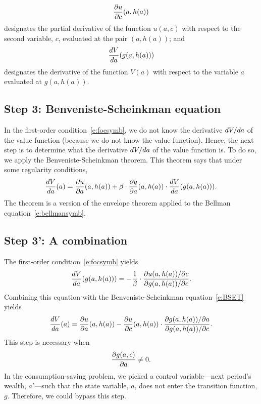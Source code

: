 \documentclass[letterpaper, 11pt, leqno]{article}
\begin{document}
\begin{equation*}
\pd{u}{c}(a,h(a))
\end{equation*}
designates the partial derivative of the function $u(a,c)$ with respect to the second variable, $c$, evaluated at the pair $(a,h(a))$;
and 
\begin{equation*}
\od{V}{a}(g(a,h(a)))
\end{equation*}
designates the derivative of the function $V(a)$ with respect to the variable $a$ evaluated at $g(a,h(a))$.

\subsection{Step 3: Benveniste-Scheinkman equation}

In the first-order condition~\eqref{e:focsymb}, we do not know the derivative $\odx{V}{a}$ of the value function (because we do not know the value function). Hence, the next step is to determine what the derivative $\odx{V}{a}$ of the value function is. To do so, we apply the Benveniste-Scheinkman theorem. This theorem says that under some regularity conditions,
\begin{align}
\od{V}{a}(a)=\pd{u}{a}(a,h(a))+\b\cdot \pd{g}{a}(a,h(a))\cdot \od{V}{a}(g(a,h(a))).\label{e:BSET}
\end{align}
The theorem is a version of the envelope theorem applied to the Bellman equation~\eqref{e:bellmansymb}.

\subsection{Step 3': A combination}

The first-order condition~\eqref{e:focsymb} yields
\begin{align}
\od{V}{a}(g(a,h(a)))=-\frac{1}{\b}\cdot \frac{\pdx{u(a,h(a))}{c}}{\pdx{g(a,h(a))}{c}}.
\end{align}
Combining this equation with the Benveniste-Scheinkman equation~\eqref{e:BSET} yields
\begin{align}
\od{V}{a}(a)=\pd{u}{a}(a,h(a))-\pd{u}{c}(a,h(a))\cdot \frac{\pdx{g(a,h(a))}{a}}{\pdx{g(a,h(a))}{c}}.\label{e:plug}
\end{align}
This step is necessary when 
\begin{equation*}
\pd{g(a,c)}{a}\neq 0.
\end{equation*} In the consumption-saving problem, we picked a control variable---next period's wealth, $a'$---such that the state variable, $a$, does not enter the transition function, $g$. Therefore, we could bypass this step.
\end{document}
